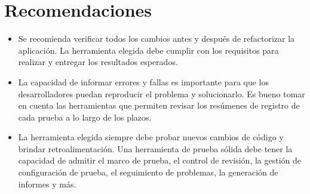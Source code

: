\documentclass[twoside,twocolumn]{article}
\begin{document}

\section{Recomendaciones}


\begin{itemize}
\item Se recomienda verificar todos los cambios antes y después de refactorizar la aplicación. La herramienta elegida debe cumplir con los requisitos para realizar y entregar los resultados esperados.
\item La capacidad de informar errores y fallas es importante para que los desarrolladores puedan reproducir el problema y solucionarlo. Es bueno tomar en cuenta las herramientas que permiten revisar los resúmenes de registro de cada prueba a lo largo de los plazos.
\item La herramienta elegida siempre debe probar nuevos cambios de código y brindar retroalimentación. Una herramienta de prueba sólida debe tener la capacidad de admitir el marco de prueba, el control de revisión, la gestión de configuración de prueba, el seguimiento de problemas, la generación de informes y más.


\end{itemize}



\end{document}
